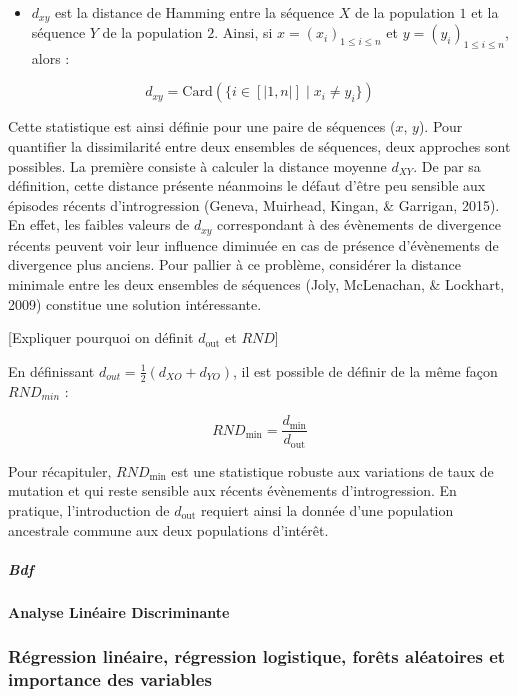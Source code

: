 \documentclass[12pt,twoside]{ugathesis}
\providecommand{\tightlist}{%
  \setlength{\itemsep}{0pt}\setlength{\parskip}{0pt}}
\begin{document}
~
\begin{itemize}
\tightlist
\item
  \(d_{xy}\) est la distance de Hamming entre la séquence \(X\) de la
  population \(1\) et la séquence \(Y\) de la population \(2\). Ainsi,
  si \(x = (x_i)_{1 \leq i \leq n}\) et \(y = (y_i)_{1 \leq i \leq n}\),
  alors :
\end{itemize}
\[d_{xy} = \text{Card}(\{i \in [|1, n|] \; | \; x_i \neq y_i \})\]

Cette statistique est ainsi définie pour une paire de séquences (\(x\),
\(y\)). Pour quantifier la dissimilarité entre deux ensembles de
séquences, deux approches sont possibles. La première consiste à
calculer la distance moyenne \(d_{XY}\). De par sa définition, cette
distance présente néanmoins le défaut d'être peu sensible aux épisodes
récents d'introgression (Geneva, Muirhead, Kingan, \& Garrigan, 2015).
En effet, les faibles valeurs de \(d_{xy}\) correspondant à des
évènements de divergence récents peuvent voir leur influence diminuée en
cas de présence d'évènements de divergence plus anciens. Pour pallier à
ce problème, considérer la distance minimale entre les deux ensembles de
séquences (Joly, McLenachan, \& Lockhart, 2009) constitue une solution
intéressante.

{[}Expliquer pourquoi on définit \(d_{\text{out}}\) et \(RND\){]}

En définissant \(d_{out} = \frac{1}{2}(d_{XO} + d_{YO})\), il est
possible de définir de la même façon \(RND_{min}\) :

\[RND_{\text{min}} = \frac{d_{\text{min}}}{d_{\text{out}}}\]

Pour récapituler, \(RND_{\text{min}}\) est une statistique robuste aux
variations de taux de mutation et qui reste sensible aux récents
évènements d'introgression. En pratique, l'introduction de
\(d_{\text{out}}\) requiert ainsi la donnée d'une population ancestrale
commune aux deux populations d'intérêt.

\subparagraph{Bdf}\label{bdf}

\paragraph{Analyse Linéaire
Discriminante}\label{analyse-lineaire-discriminante}

\subsubsection{Régression linéaire, régression logistique, forêts
aléatoires et importance des
variables}\label{regression-lineaire-regression-logistique-forets-aleatoires-et-importance-des-variables}
\end{document}
